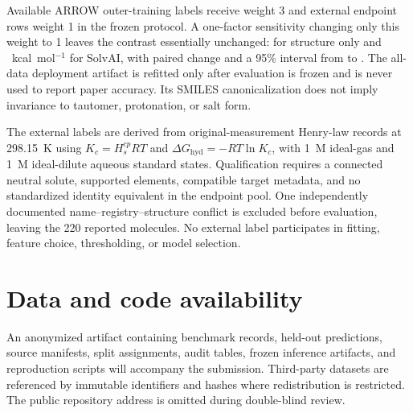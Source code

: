 \documentclass{article}
\begin{document}
Available ARROW outer-training labels receive weight 3 and external endpoint rows
weight 1 in the frozen protocol. A one-factor sensitivity changing only this weight
to 1 leaves the contrast essentially unchanged: \WeightOneStructureMAE{} for
structure only and \WeightOneSolvAIMAE{}~kcal~mol$^{-1}$ for SolvAI, with paired
change \WeightOneDelta{} and a 95\% interval from \WeightOneCILow{} to
\WeightOneCIHigh{}. The all-data deployment artifact is refitted only after evaluation
is frozen and is never used to report paper accuracy. Its SMILES canonicalization does
not imply invariance to tautomer, protonation, or salt form.

The external labels are derived from original-measurement Henry-law records at
298.15~K using $K_c=H_s^{cp}RT$ and
$\Delta G_{\mathrm{hyd}}=-RT\ln K_c$, with 1~M ideal-gas and 1~M
ideal-dilute aqueous standard states. Qualification requires a connected neutral
solute, supported elements, compatible target metadata, and no standardized identity
equivalent in the endpoint pool. One independently documented
name--registry--structure conflict is excluded before evaluation, leaving the 220
reported molecules. No external label participates in fitting, feature choice,
thresholding, or model selection.

\section*{Data and code availability}
An anonymized artifact containing benchmark records, held-out predictions, source
manifests, split assignments, audit tables, frozen inference artifacts, and
reproduction scripts will accompany the submission. Third-party datasets are
referenced by immutable identifiers and hashes where redistribution is restricted.
The public repository address is omitted during double-blind review.

\clearpage



\clearpage
\nolinenumbers

\linenumbers

\clearpage

\end{document}
